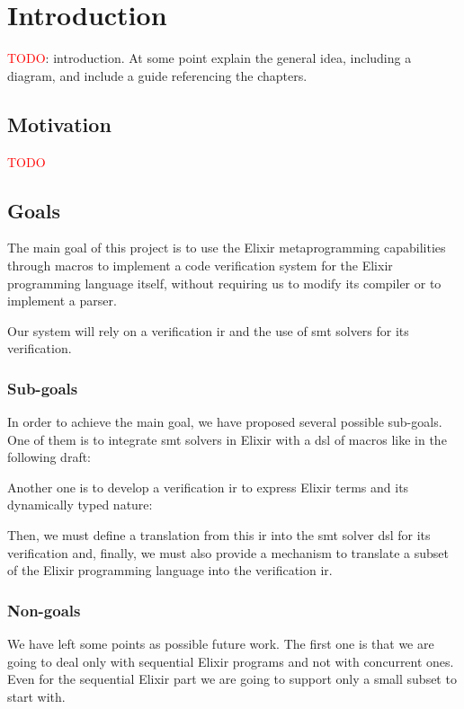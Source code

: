 \chapter{Introduction}
\label{cap:introduction}

\textcolor{red}{TODO}: introduction. At some point explain the general idea, 
including a diagram, and include a guide referencing the chapters.

\section{Motivation}

\textcolor{red}{TODO}

\section{Goals}

The main goal of this project is to use the Elixir metaprogramming capabilities
through macros to implement a code verification system for the Elixir
programming language itself, without requiring us to modify its compiler or to
implement a parser.

Our system will rely on a verification \gls{ir} and the use of \acrshort{smt}
solvers for its verification.

\subsection{Sub-goals}

In order to achieve the main goal, we have proposed several possible sub-goals.
One of them is to integrate \acrshort{smt} solvers in Elixir with a \gls{dsl} of
macros like in the following draft:

Another one is to develop a verification \gls{ir} to express Elixir terms and
its dynamically typed nature:

Then, we must define a translation from this \gls{ir} into the \acrshort{smt}
solver \gls{dsl} for its verification and, finally, we must also provide a
mechanism to translate a subset of the Elixir programming language into the
verification \gls{ir}.

\subsection{Non-goals}

We have left some points as possible future work. The first one is that we are
going to deal only with sequential Elixir programs and not with concurrent ones.
Even for the sequential Elixir part we are going to support only a small subset 
to start with.

